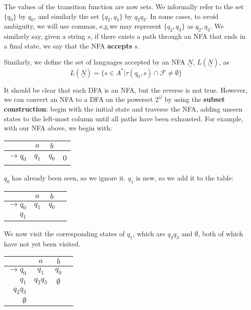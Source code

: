 The values of the transition function are now sets. We informally refer to the set \( \{q_0\} \) by \(q_0\), and similarly the set \( \{q_2, q_3\} \) by \(q_2q_3\). In some cases, to avoid ambiguity, we will use commas, e.g.\@ we may represent \( \{q_2, q_3\} \) as \(q_2,q_3\). We similarly say, given a string \(s\), if there exists a path through an NFA that ends in a final state, we say that the NFA \textbf{accepts} \(s\).

Similarly, we define the set of languages accepted by an NFA \(\underset{\sim}{N}\), \(L(\underset{\sim}{N})\), as \[L(\underset{\sim}{N}) = \{s\in A^*|\tau(q_0, s)\cap\mathcal{F}\neq\emptyset \} \]

It should be clear that each DFA is an NFA, but the reverse is not true. However, we can convert an NFA to a DFA on the powerset \(2^{\mathcal{Q}}\) by using the \textbf{subset construction}: begin with the initial state and traverse the NFA, adding unseen states to the left-most column until all paths have been exhausted. For example, with our NFA above, we begin with:

\begin{center}\begin{tabular}{r c c r}
         & \(a\) & \(b\) & \\\bottomrule
    \(\to q_0\) & \(q_1\) & \(q_0\) & 0 \\
\end{tabular}\end{center}

\(q_0\) has already been seen, so we ignore it. \(q_1\) is new, so we add it to the table:

\begin{center}\begin{tabular}{r c c r}
         & \(a\) & \(b\) & \\\bottomrule
    \(\to q_0\) & \(q_1\) & \(q_0\) &  \\
          \(q_1\) &       &       & 
\end{tabular}\end{center}

We now visit the corresponding states of \(q_1\), which are \(q_2q_3\) and \(\emptyset \), both of which have not yet been visited. 

\begin{center}\begin{tabular}{r c c r}
         & \(a\) & \(b\) & \\\bottomrule
    \(\to q_0\) & \(q_1\) & \(q_0\) &  \\
          \(q_1\) & \(q_2q_3\) & \(\emptyset \) & \\
          \(q_2q_3\) & & & \\
          \(\emptyset \) & & &
\end{tabular}\end{center}

